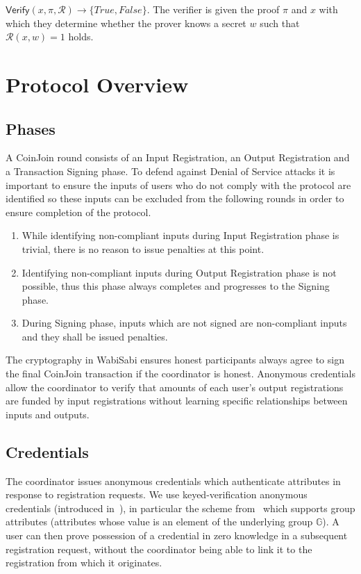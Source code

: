 \documentclass{article}
\begin{document}
\noindent$\mathsf{Verify}(x,\pi,\mathcal{R})\xrightarrow{}\{\mathit{True},\mathit{False}\}$. The verifier is given the proof $\pi$ and $x$ with which they determine whether the prover knows a secret $w$ such that $\mathcal{R}(x,w)=1$ holds.

\section{Protocol Overview}

\subsection{Phases}

A CoinJoin round consists of an Input Registration, an Output Registration and a Transaction Signing phase. To defend against Denial of Service attacks it is important to ensure the inputs of users who do not comply with the protocol are identified so these inputs can be excluded from the following rounds in order to ensure completion of the protocol.

\begin{enumerate}
    \item While identifying non-compliant inputs during Input Registration phase is trivial, there is no reason to issue penalties at this point.
    \item Identifying non-compliant inputs during Output Registration phase is not possible, thus this phase always completes and progresses to the Signing phase.
    \item During Signing phase, inputs which are not signed are non-compliant inputs and they shall be issued penalties.
\end{enumerate}

The cryptography in WabiSabi ensures honest participants always agree to sign the final CoinJoin transaction if the coordinator is honest. Anonymous credentials allow the coordinator to verify that amounts of each user's output registrations are funded by input registrations without learning specific relationships between inputs and outputs.

\subsection{Credentials}

The coordinator issues anonymous credentials which authenticate attributes in response to registration requests. We use keyed-verification anonymous credentials (introduced in~\cite{chase2014algebraic}), in particular the scheme from~\cite{chase2019signal} which supports group attributes (attributes whose value is an element of the underlying group $\mathbb{G}$). A user can then prove possession of a credential in zero knowledge in a subsequent registration request, without the coordinator being able to link it to the registration from which it originates.
\end{document}
